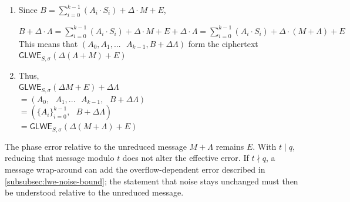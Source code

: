 \begin{myproof}

\begin{enumerate}
\item Since $B = \sum\limits_{i=0}^{k-1}{(A_i \cdot S_i)} + \Delta \cdot M + E$,

$B + \Delta \cdot \Lambda = \sum\limits_{i=0}^{k-1}{(A_i \cdot S_i)} + \Delta \cdot M + E + \Delta \cdot \Lambda = \sum\limits_{i=0}^{k-1}{(A_i \cdot S_i)} + \Delta \cdot (M + \Lambda) + E$  \\

This means that $(A_0, A_1, ... \text{ } A_{k-1}
, B + \Delta \Lambda)$ form the ciphertext $\textsf{GLWE}_{S, \sigma}(\Delta (\Lambda + M) + E)$
\item Thus, \\
$\textsf{GLWE}_{S, \sigma}(\Delta M + E) + \Delta\Lambda$ \\
$ = (A_0, \text { } A_1, ... \text{ } A_{k-1}, \text { } B + \Delta \Lambda)$ \\
$ = (\{A_i\}_{i=0}^{k-1}, \text { } B + \Delta \Lambda)$ \\
$= \textsf{GLWE}_{S, \sigma}(\Delta (M + \Lambda) + E)$

\end{enumerate}

\end{myproof}


 The phase error relative to the unreduced message $M+\Lambda$ remains $E$. With $t\mid q$, reducing that message modulo $t$ does not alter the effective error. If $t\nmid q$, a message wrap-around can add the overflow-dependent error described in \autoref{subsubsec:lwe-noise-bound}; the statement that noise stays unchanged must then be understood relative to the unreduced message.